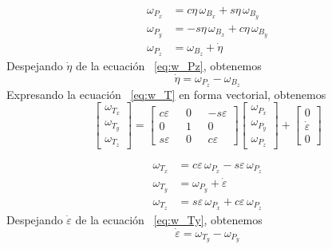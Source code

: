\begin{align}
\omega_{P_x} & =c \eta \, \omega_{B_x} + s \eta \, \omega_{B_y} \label{eq:w_Px} \\
\omega_{P_y} & = -s \eta \, \omega_{B_x} + c \eta \, \omega_{B_y} \label{eq:w_Py} \\
\omega_{P_z} & =\omega_{B_z} + \dot{\eta} \label{eq:w_Pz}
\end{align}
Despejando $\dot{\eta}$ de la ecuaci\'{o}n ~\ref{eq:w_Pz}, obtenemos
\begin{equation}
\dot{\eta }=\omega _{P_z}-\omega _{B_z}
\label{eq:eta_dot}
\end{equation}
Expresando la ecuaci\'{o}n ~\ref{eq:w_T} en forma vectorial, obtenemos
\begin{equation}
\left[\begin{array}{c} \omega_{T_x} \\\omega_{T_y} \\ \omega_{T_z} \end{array}\right] =
\left[  \begin{array}{ccc} c\varepsilon & 0 & -s\varepsilon \\  0 & 1 & 0 \\  s\varepsilon \text{\ \ \ } & 0\text{\ \ } & c\varepsilon \end{array}\right]
\left[\begin{array}{c} \omega_{P_x} \\\omega_{P_y} \\ \omega_{P_z} \end{array}\right] +
\left[\begin{array}{c} 0 \\  \dot{\varepsilon } \\ 0  \end{array}\right]
\label{eq:w_T_vectf}
\end{equation}

\begin{align}
\omega_{T_x} & =c \varepsilon \, \omega_{P_x} - s \varepsilon \, \omega_{P_z} \label{eq:w_Tx}\\
\omega_{T_y} & = \omega_{P_y} + \dot{\varepsilon} \label{eq:w_Ty}\\
\omega_{T_z} & =s \varepsilon \, \omega_{P_x} + c \varepsilon \, \omega_{P_z} \label{eq:w_Tz}
\end{align}
Despejando $\dot{\varepsilon}$ de la ecuaci\'{o}n ~\ref{eq:w_Ty}, obtenemos
\begin{equation}
\dot{\varepsilon }=\omega _{T_y}-\omega _{P_y}
\label{eq:varepsi_dot}
\end{equation}




